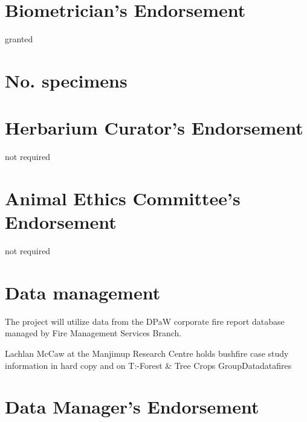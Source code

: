 \documentclass[version=last, paper=a4, DIV=18, usenames, dvipsnames]{scrartcl}
\begin{document}
\section{Biometrician's Endorsement}



granted







\section{No. specimens}





\section{Herbarium Curator's Endorsement}



not required






\section{Animal Ethics Committee's Endorsement}



not required






\section{Data management}



The project will utilize data from the DPaW corporate fire report database managed by Fire Management Services Branch.


Lachlan McCaw at the Manjimup Research Centre holds bushfire case study information in hard copy and on T:-Forest \& Tree Crops Group\Shared Data\Lachies data\Fire\Forest fires






\section{Data Manager's Endorsement}
\end{document}
